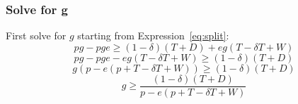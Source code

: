 \documentclass[12pt]{article}
\newcommand{\de}{\delta}
\begin{document}
\subsubsection{Solve for g}			
			First solve for $g$ starting from Expression~\ref{eq:split}:
					$$pg - pge \geq \left(1 - \de \right) \left( T + D \right) + eg \left( T - \de T + W \right)$$
					$$pg - pge - eg \left( T - \de T + W \right)\geq \left(1 - \de \right) \left( T + D \right)$$
					\begin{equation}
						g \left(p - e \left( p + T - \de T + W \right) \right) \geq \left(1 - \de \right) \left( T + D \right)
						\label{eq:g1}
					\end{equation}
					\begin{equation}
						g \geq \frac{\left(1 - \de \right) \left( T + D \right)}{p - e \left( p + T - \de T + W \right)}
						\label{eq:g2}
					\end{equation}
\end{document}
